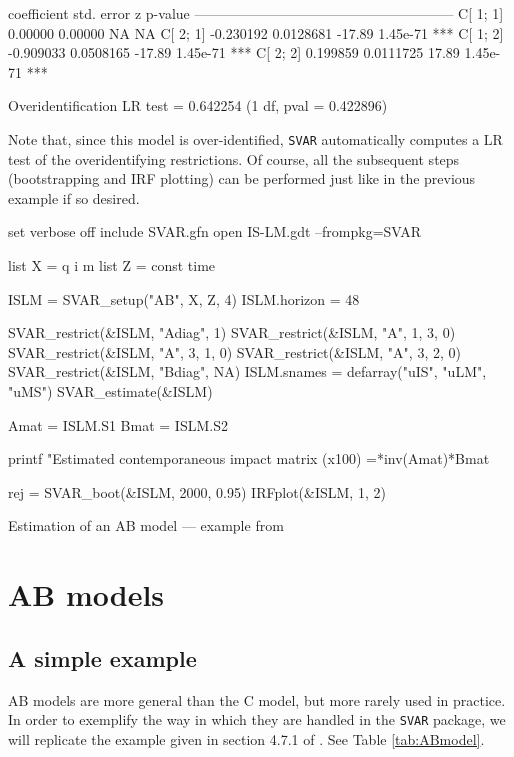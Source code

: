 \documentclass[a4paper,10pt]{article}
\begin{document}

\begin{code}
             coefficient   std. error     z       p-value 
  --------------------------------------------------------
  C[ 1; 1]     0.00000     0.00000       NA      NA       
  C[ 2; 1]    -0.230192    0.0128681    -17.89    1.45e-71 ***
  C[ 1; 2]    -0.909033    0.0508165    -17.89    1.45e-71 ***
  C[ 2; 2]     0.199859    0.0111725     17.89    1.45e-71 ***

Overidentification LR test = 0.642254 (1 df, pval = 0.422896)
\end{code}

Note that, since this model is over-identified, \texttt{SVAR}
automatically computes a LR test of the overidentifying
restrictions. Of course, all the subsequent steps (bootstrapping and
IRF plotting) can be performed just like in the previous example if
so desired.

\begin{table}[htbp]
  \begin{scode}
set verbose off
include SVAR.gfn
open IS-LM.gdt --frompkg=SVAR

list X = q i m
list Z = const time

ISLM = SVAR_setup("AB", X, Z, 4)
ISLM.horizon = 48

SVAR_restrict(&ISLM, "Adiag", 1)
SVAR_restrict(&ISLM, "A", 1, 3, 0)
SVAR_restrict(&ISLM, "A", 3, 1, 0)
SVAR_restrict(&ISLM, "A", 3, 2, 0)
SVAR_restrict(&ISLM, "Bdiag", NA)
ISLM.snames = defarray("uIS", "uLM", "uMS")
SVAR_estimate(&ISLM)

Amat = ISLM.S1
Bmat = ISLM.S2

printf "Estimated contemporaneous impact matrix (x100) =*inv(Amat)*Bmat

rej = SVAR_boot(&ISLM, 2000, 0.95)
IRFplot(&ISLM, 1, 2)
  \end{scode}
  \caption{Estimation of an AB model --- example from \cite{LKBook04}}
  \label{tab:ABmodel}
\end{table}

\section{AB models}
\label{sec:ABmodels}
\subsection{A simple example}

AB models are more general than the C model, but more rarely used in
practice. In order to exemplify the way in which they are handled in
the \texttt{SVAR} package, we will replicate the example given in
section 4.7.1 of  \cite{LKBook04}. See Table
\ref{tab:ABmodel}.
\end{document}
